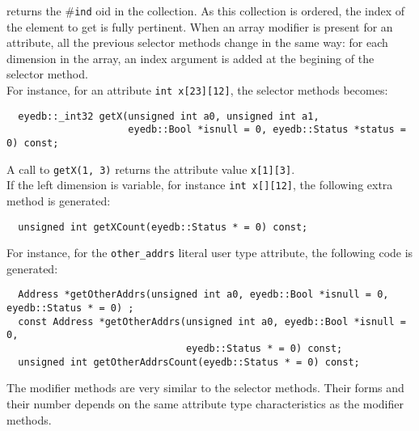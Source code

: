 \normalsize
returns the \#\texttt{ind} oid in the collection.
As this collection is ordered, the index of the element to get is fully
pertinent.
\ee
{}
When an array modifier is present for an attribute, all the previous
selector methods change in the same way: for each dimension in the
array, an index argument is added at the begining of the selector method.
\\
For instance, for an attribute \texttt{int x[23][12]}, the selector methods
becomes:
\verbsize
\begin{verbatim}
  eyedb::_int32 getX(unsigned int a0, unsigned int a1,
                     eyedb::Bool *isnull = 0, eyedb::Status *status = 0) const;
\end{verbatim}
\normalsize
A call to \texttt{getX(1, 3)} returns the attribute value \texttt{x[1][3]}.
\\
If the left dimension is variable, for instance \texttt{int x[][12]},
the following extra method is generated:
\verbsize
\begin{verbatim}
  unsigned int getXCount(eyedb::Status * = 0) const;
\end{verbatim}
\normalsize
For instance,
for the \texttt{other\_addrs} literal user type attribute, the following
code is generated:
\verbsize
\begin{verbatim}
  Address *getOtherAddrs(unsigned int a0, eyedb::Bool *isnull = 0, eyedb::Status * = 0) ;
  const Address *getOtherAddrs(unsigned int a0, eyedb::Bool *isnull = 0,
                               eyedb::Status * = 0) const;
  unsigned int getOtherAddrsCount(eyedb::Status * = 0) const;
\end{verbatim}
\normalsize
%
The modifier methods are very similar to the selector methods.
Their forms and their number depends on the same attribute type characteristics
as the modifier methods.

